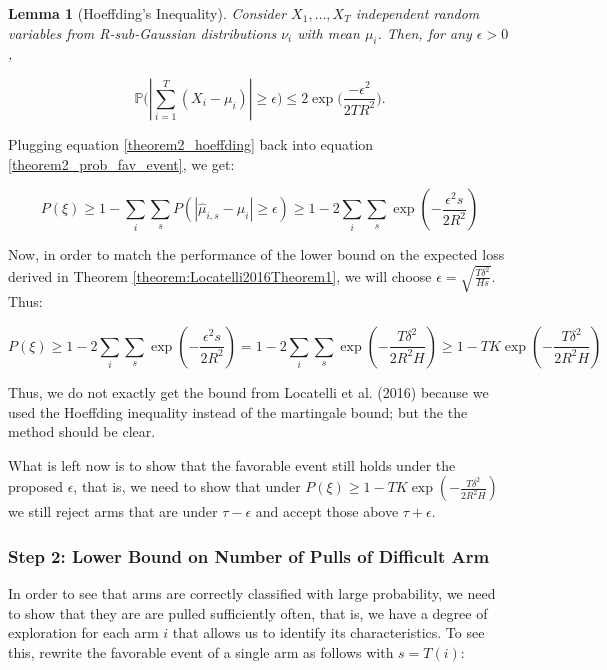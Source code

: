 \documentclass[12pt,]{article}
\newtheorem{lemma}{Lemma}
\begin{document}
\begin{lemma}[Hoeffding's Inequality] \label{lemma:HoeffdingInequality}
Consider $X_1, \dots, X_T$ independent random variables from R-sub-Gaussian distributions $\nu_i$ with mean $\mu_i$. Then, for any $\epsilon > 0$,

\begin{equation*}
\mathbb{P} \Big( | \sum_{i = 1}^T (X_i - \mu_i) | \geq \epsilon \Big) \leq 2\exp \Big(\frac{-\epsilon^2}{2T R^2}\Big).
\end{equation*}
\end{lemma}

Plugging equation \eqref{theorem2_hoeffding} back into equation
\eqref{theorem2_prob_fav_event}, we get:

\begin{equation}
P(\xi) \geq 1 - \sum_i \sum_s P(| \hat{\mu}_{i,s} - \mu_i| \geq \epsilon) \geq 1 - 2 \sum_i \sum_s \exp (-\frac{\epsilon^2 s}{2 R^2})
\end{equation}

Now, in order to match the performance of the lower bound on the
expected loss derived in Theorem \ref{theorem:Locatelli2016Theorem1}, we
will choose \(\epsilon = \sqrt{\frac{T \delta^2}{Hs}}\). Thus:

\begin{equation}
P(\xi) \geq 1 - 2 \sum_i \sum_s \exp (-\frac{\epsilon^2 s}{2 R^2}) = 1 - 2 \sum_i \sum_s \exp (-\frac{T \delta^2}{2 R^2 H}) \geq 1 - TK \exp(-\frac{T\delta^2}{2R^2H})
\end{equation}

Thus, we do not exactly get the bound from Locatelli et al. (2016)
because we used the Hoeffding inequality instead of the martingale
bound; but the the method should be clear.

What is left now is to show that the favorable event still holds under
the proposed \(\epsilon\), that is, we need to show that under
\(P(\xi) \geq 1 - TK \exp(-\frac{T\delta^2}{2R^2H})\) we still reject
arms that are under \(\tau - \epsilon\) and accept those above
\(\tau + \epsilon\).

\subsubsection{Step 2: Lower Bound on Number of Pulls of Difficult
Arm}\label{step-2-lower-bound-on-number-of-pulls-of-difficult-arm}

In order to see that arms are correctly classified with large
probability, we need to show that they are are pulled sufficiently
often, that is, we have a degree of exploration for each arm \(i\) that
allows us to identify its characteristics. To see this, rewrite the
favorable event of a single arm as follows with \(s = T(i)\):
\end{document}

